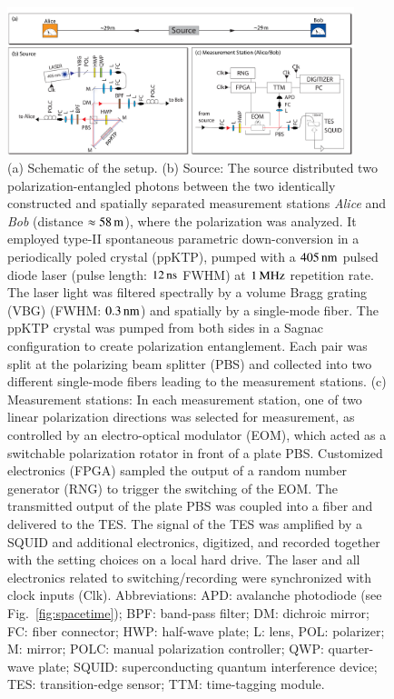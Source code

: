 \documentclass[superscriptaddress,twocolumn]{revtex4-1}
\begin{document}
\begin{figure}[!htp]
	\includegraphics[width=0.9\textwidth]{schematic_v5a.pdf}
	\caption{\label{fig:setup}(a) Schematic of the setup. (b) Source: The source distributed two polarization-entangled photons between the two identically constructed and spatially separated measurement stations \textit{Alice} and \textit{Bob} (distance $\unit[\approx58]{m}$), where the polarization was analyzed. It employed type-II spontaneous parametric down-conversion in a periodically poled crystal (\mbox{ppKTP}),  pumped with a $\unit[405]{nm}$ pulsed diode laser (pulse length:  $\unit[12]{ns}$ FWHM) at $\unit[1]{MHz}$ repetition rate. The laser light was filtered spectrally by a volume Bragg grating (VBG) (FWHM: $\unit[0.3]{nm}$) and spatially by a single-mode fiber.  The ppKTP crystal was pumped from both sides in a Sagnac configuration to create polarization entanglement. Each pair was split at the polarizing beam splitter (PBS) and collected into two different single-mode fibers leading to the measurement stations. 
	 (c) Measurement stations: 
	In each measurement station, one of two linear polarization directions was selected for measurement, as controlled by an electro-optical modulator (EOM), which acted as a switchable polarization rotator in front of a plate PBS. Customized electronics (FPGA) sampled the output of a random number generator (RNG) to trigger the switching of the EOM. The transmitted output of the plate PBS was coupled into a fiber and delivered to the TES. The signal of the TES was amplified by a SQUID and additional electronics, digitized, and recorded together with the setting choices on a local hard drive. The laser and all electronics related to switching/recording were synchronized with clock inputs (Clk). Abbreviations: APD: avalanche photodiode (see Fig.~\ref{fig:spacetime}); BPF: band-pass filter; DM: dichroic mirror; FC: fiber connector; HWP: half-wave plate; L: lens, POL: polarizer; M: mirror;  POLC: manual polarization controller;  QWP: quarter-wave plate; SQUID: superconducting quantum interference device; TES: transition-edge sensor;   TTM: time-tagging module.}
\end{figure}
\end{document}

